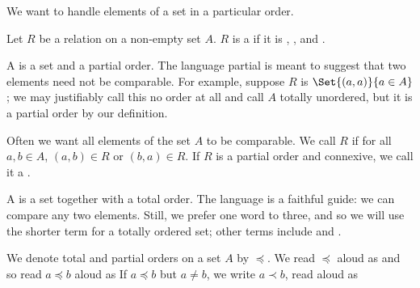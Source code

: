 
\sbasic




\sstart



We want to handle elements of a set in a particular order.


Let $R$ be a relation on a non-empty set $A$.
$R$ is a  if it is
, ,
and .

A  is a set
and a partial order.
The language partial is meant to suggest that two elements
need not be comparable.
For example, suppose $R$ is $\Set{(a,a)}{a \in A}$;
we may justifiably call this no order at all and
call $A$ totally unordered, but it is a partial order
by our definition.

Often we want all elements of the set $A$ to be comparable.
We call $R$  if for all
$a, b \in A$, $(a, b) \in R$ or $(b, a) \in R$.
If $R$ is a partial order and connexive,
we call it a .

A  is a set
together with a total order.
The language is a faithful guide: we can compare any
two elements.
Still, we prefer one word to three, and so we will use
the shorter term  for a
totally ordered set; other terms include
 and
.

We denote total and partial orders on a set $A$ by $\preceq$.
We read $\preceq$ aloud as  and so read $a\preceq b$ aloud as 
If $a \preceq b$ but $a \neq b$, we write $a \prec b$, read aloud as 


\strats
